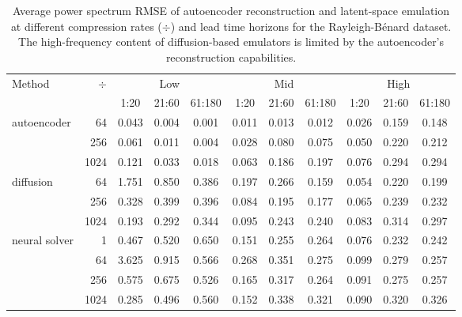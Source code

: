 \begin{subappendices}
\begin{table}[h]
    \centering
    \caption{Average power spectrum RMSE of autoencoder reconstruction and latent-space emulation at different compression rates ($\div$) and lead time horizons for the Rayleigh-Bénard dataset. The high-frequency content of diffusion-based emulators is limited by the autoencoder's reconstruction capabilities.}
    \footnotesize
    \begin{tabular}{lrccccccccc}
        \toprule
        \multirow[c]{2}{*}{Method} & \multirow[c]{2}{*}{$\div$ \hspace{0.1em}} & \multicolumn{3}{c}{Low} & \multicolumn{3}{c}{Mid} & \multicolumn{3}{c}{High} \\
        \cmidrule(lr){3-5} \cmidrule(lr){6-8} \cmidrule(lr){9-11}
         & & 1:20 & 21:60 & 61:180 & 1:20 & 21:60 & 61:180 & 1:20 & 21:60 & 61:180 \\
        \midrule
        \multirow[c]{3}{*}{autoencoder}
        & 64   & 0.043 & 0.004 & 0.001 & 0.011 & 0.013 & 0.012 & 0.026 & 0.159 & 0.148 \\
        & 256  & 0.061 & 0.011 & 0.004 & 0.028 & 0.080 & 0.075 & 0.050 & 0.220 & 0.212 \\
        & 1024 & 0.121 & 0.033 & 0.018 & 0.063 & 0.186 & 0.197 & 0.076 & 0.294 & 0.294 \\
        \midrule
        \multirow[c]{3}{*}{diffusion}
        & 64   & 1.751 & 0.850 & 0.386 & 0.197 & 0.266 & 0.159 & 0.054 & 0.220 & 0.199 \\
        & 256  & 0.328 & 0.399 & 0.396 & 0.084 & 0.195 & 0.177 & 0.065 & 0.239 & 0.232 \\
        & 1024 & 0.193 & 0.292 & 0.344 & 0.095 & 0.243 & 0.240 & 0.083 & 0.314 & 0.297 \\
        \midrule
        \multirow[c]{4}{*}{neural solver}
        & 1    & 0.467 & 0.520 & 0.650 & 0.151 & 0.255 & 0.264 & 0.076 & 0.232 & 0.242 \\
        & 64   & 3.625 & 0.915 & 0.566 & 0.268 & 0.351 & 0.275 & 0.099 & 0.279 & 0.257 \\
        & 256  & 0.575 & 0.675 & 0.526 & 0.165 & 0.317 & 0.264 & 0.091 & 0.275 & 0.257 \\
        & 1024 & 0.285 & 0.496 & 0.560 & 0.152 & 0.338 & 0.321 & 0.090 & 0.320 & 0.326 \\
        \bottomrule
    \end{tabular}
    \label{tab:rb-power-rmse}
\end{table}


\end{subappendices}
